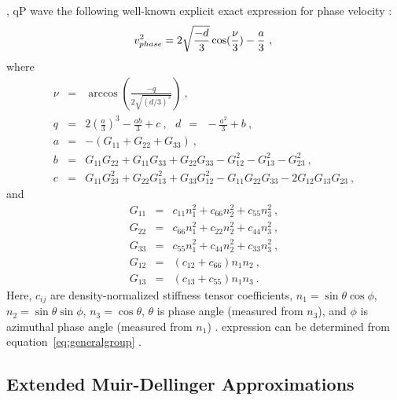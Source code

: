 , qP wave  the following well-known explicit exact expression for phase velocity  \cite[]{helbig,tsvankinortho,tsvankinbook}:
\begin{equation}
\label{eq:orthoexactphase}
v^2_{phase} = 2\sqrt{\frac{-d}{3}}\cos(\frac{\nu}{3})-\frac{a}{3} ~,\\
\end{equation}
where
\begin{eqnarray}
\nonumber
\nu & = & \arccos \left(\frac{-q}{2\sqrt{(d/3)^3}}\right)~,\\
\nonumber
q & = & 2\left(\frac{a}{3}\right)^3 - \frac{ab}{3}+c~,~~~d~~=~~-\frac{a^2}{3} + b~,\\
\nonumber
a & = & -(G_{11}+G_{22}+G_{33})~,\\
\nonumber
b & = & G_{11}G_{22}+G_{11}G_{33}+G_{22}G_{33}-G^2_{12}-G^2_{13}-G^2_{23}~,\\
\nonumber
c & = & G_{11}G^2_{23}+G_{22}G^2_{13}+G_{33}G^2_{12}-G_{11}G_{22}G_{33}-2G_{12}G_{13}G_{23}~,
\end{eqnarray}
and
\begin{eqnarray}
\nonumber
G_{11} & = & c_{11}n^2_1 + c_{66}n^2_2 + c_{55}n^2_3~,\\
\nonumber
G_{22} & = & c_{66}n^2_1 + c_{22}n^2_2 + c_{44}n^2_3~,\\
\nonumber
G_{33} & = & c_{55}n^2_1 + c_{44}n^2_2 + c_{33}n^2_3~,\\
\nonumber
G_{12} & = & (c_{12}+c_{66})n_1n_2~,\\
\nonumber
G_{13} & = & (c_{13}+c_{55})n_1n_3~.
\end{eqnarray}
Here, $c_{ij}$ are density-normalized stiffness tensor coefficients, $n_1 = \sin\theta \cos\phi$, $n_2 = \sin\theta \sin\phi$, $n_3 = \cos\theta$, $\theta$ is  phase angle (measured from $n_3$), and  $\phi$ is azimuthal phase angle (measured from $n_1$) .  expression can be determined from equation~\ref{eq:generalgroup} .


\subsection{Extended Muir-Dellinger Approximations}

